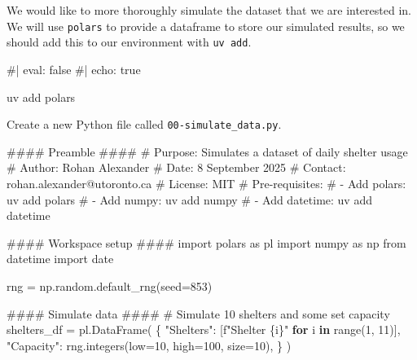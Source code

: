 \documentclass[
  letterpaper,
  DIV=11,
  numbers=noendperiod]{scrartcl}
\newenvironment{Shaded}{\begin{snugshade}}{\end{snugshade}}
\newcommand{\BuiltInTok}[1]{\textcolor[rgb]{0.00,0.23,0.31}{#1}}
\newcommand{\CommentTok}[1]{\textcolor[rgb]{0.37,0.37,0.37}{#1}}
\newcommand{\ControlFlowTok}[1]{\textcolor[rgb]{0.00,0.23,0.31}{\textbf{#1}}}
\newcommand{\DecValTok}[1]{\textcolor[rgb]{0.68,0.00,0.00}{#1}}
\newcommand{\ImportTok}[1]{\textcolor[rgb]{0.00,0.46,0.62}{#1}}
\newcommand{\KeywordTok}[1]{\textcolor[rgb]{0.00,0.23,0.31}{\textbf{#1}}}
\newcommand{\NormalTok}[1]{\textcolor[rgb]{0.00,0.23,0.31}{#1}}
\newcommand{\OperatorTok}[1]{\textcolor[rgb]{0.37,0.37,0.37}{#1}}
\newcommand{\SpecialCharTok}[1]{\textcolor[rgb]{0.37,0.37,0.37}{#1}}
\newcommand{\SpecialStringTok}[1]{\textcolor[rgb]{0.13,0.47,0.30}{#1}}
\newcommand{\StringTok}[1]{\textcolor[rgb]{0.13,0.47,0.30}{#1}}
\begin{document}
We would like to more thoroughly simulate the dataset that we are
interested in. We will use \texttt{polars} to provide a dataframe to
store our simulated results, so we should add this to our environment
with \texttt{uv\ add}.

\begin{Shaded}
\begin{Highlighting}[]
\NormalTok{\#| eval: false}
\NormalTok{\#| echo: true}

\NormalTok{uv add polars}
\end{Highlighting}
\end{Shaded}

Create a new Python file called \texttt{00-simulate\_data.py}.

\begin{Shaded}
\begin{Highlighting}[]
\CommentTok{\#\#\#\# Preamble \#\#\#\#}
\CommentTok{\# Purpose: Simulates a dataset of daily shelter usage}
\CommentTok{\# Author: Rohan Alexander}
\CommentTok{\# Date: 8 September 2025}
\CommentTok{\# Contact: rohan.alexander@utoronto.ca}
\CommentTok{\# License: MIT}
\CommentTok{\# Pre{-}requisites:}
\CommentTok{\# {-} Add \textasciigrave{}polars\textasciigrave{}: uv add polars}
\CommentTok{\# {-} Add \textasciigrave{}numpy\textasciigrave{}: uv add numpy}
\CommentTok{\# {-} Add \textasciigrave{}datetime\textasciigrave{}: uv add datetime}


\CommentTok{\#\#\#\# Workspace setup \#\#\#\#}
\ImportTok{import}\NormalTok{ polars }\ImportTok{as}\NormalTok{ pl}
\ImportTok{import}\NormalTok{ numpy }\ImportTok{as}\NormalTok{ np}
\ImportTok{from}\NormalTok{ datetime }\ImportTok{import}\NormalTok{ date}

\NormalTok{rng }\OperatorTok{=}\NormalTok{ np.random.default\_rng(seed}\OperatorTok{=}\DecValTok{853}\NormalTok{)}


\CommentTok{\#\#\#\# Simulate data \#\#\#\#}
\CommentTok{\# Simulate 10 shelters and some set capacity}
\NormalTok{shelters\_df }\OperatorTok{=}\NormalTok{ pl.DataFrame(}
\NormalTok{    \{}
        \StringTok{"Shelters"}\NormalTok{: [}\SpecialStringTok{f"Shelter }\SpecialCharTok{\{}\NormalTok{i}\SpecialCharTok{\}}\SpecialStringTok{"} \ControlFlowTok{for}\NormalTok{ i }\KeywordTok{in} \BuiltInTok{range}\NormalTok{(}\DecValTok{1}\NormalTok{, }\DecValTok{11}\NormalTok{)],}
        \StringTok{"Capacity"}\NormalTok{: rng.integers(low}\OperatorTok{=}\DecValTok{10}\NormalTok{, high}\OperatorTok{=}\DecValTok{100}\NormalTok{, size}\OperatorTok{=}\DecValTok{10}\NormalTok{),}
\NormalTok{    \}}
\NormalTok{)}


\end{Highlighting}
\end{Shaded}
\end{document}
